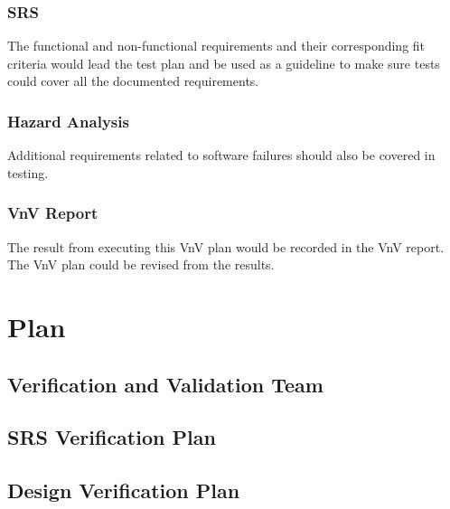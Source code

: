 \documentclass[12pt, titlepage]{article}
\begin{document}
\subsubsection{SRS}
The functional and non-functional requirements and their corresponding fit criteria would lead the test plan and be used as a guideline to make sure tests could cover all the documented requirements.
\subsubsection{Hazard Analysis}
Additional requirements related to software failures should also be covered in testing.
\subsubsection{VnV Report}
The result from executing this VnV plan would be recorded in the VnV report.  The VnV plan could be revised from the results.
\section{Plan}


\subsection{Verification and Validation Team}


\subsection{SRS Verification Plan}



\subsection{Design Verification Plan}
\end{document}

